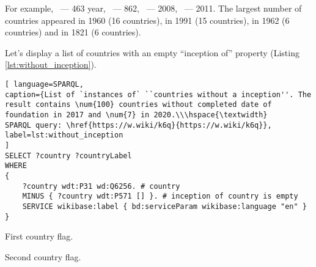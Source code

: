 For example, ~--- 463 year, ~--- 862, ~--- 2008, ~--- 2011.
The largest number of countries appeared in 1960 (16 countries), in 1991 (15 countries), in 1962 (6 countries) and in 1821 (6 countries).

Let's display a list of countries with an empty ``inception of'' property (Listing \ref{lst:without_inception}).
\begin{lstlisting}[ language=SPARQL, 
caption={List of `instances of` ``countries without a inception''. The result contains \num{100} countries without completed date of foundation in 2017 and \num{7} in 2020.\\\hspace{\textwidth}
SPARQL query: \href{https://w.wiki/k6q}{https://w.wiki/k6q}},
label=lst:without_inception
]
SELECT ?country ?countryLabel 
WHERE
{
	?country wdt:P31 wd:Q6256. # country
	MINUS { ?country wdt:P571 [] }. # inception of country is empty
	SERVICE wikibase:label { bd:serviceParam wikibase:language "en" }
}
\end{lstlisting}



\begin{marginfigure}[0.0cm]
	{
		\setlength{\fboxsep}{0pt}%
		\setlength{\fboxrule}{1pt}%
	}
	\caption{First country flag.}%
	\label{fig:flag_kor}%
\end{marginfigure}

\begin{marginfigure}[4.0cm]
	{
		\setlength{\fboxsep}{0pt}%
		\setlength{\fboxrule}{1pt}%
	}
	\caption{Second country flag.}%
	\label{fig:flag_mongolia}%
\end{marginfigure}


